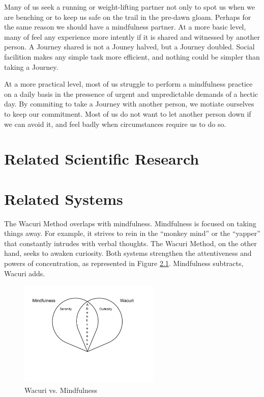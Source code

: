 \documentclass[12pt]{book}
\begin{document}
Many of us seek a running or weight-lifting partner not only to spot us when we are benching or
to keep us safe on the trail in the pre-dawn gloam.
Perhaps for the same reason we should have a mindfulness partner.
At a more basic level, many of feel any experience more intently if it is shared and
witnessed by another person. A Journey shared is not a Jouney halved, but a Journey doubled.
Social facilition makes any simple task more efficient, and nothing could be simpler
than taking a Journey.

At a more practical level, most of us struggle to perform a mindfulness practice
on a daily basis in the pressence of urgent and unpredictable demands of a hectic day.
By commiting to take a Journey with another person, we motiate ourselves to keep our
commitment. Most of us do not want to let another person down if we can avoid it,
and feel badly when circumstances require us to do so.

\chapter{Related Scientific Research}




\chapter{Related Systems}

The Wacuri Method overlaps with mindfulness.  Mindfulness is focused
on taking things away. For example, it strives to rein in the
``monkey mind'' or the ``yapper'' that constantly intrudes with
verbal thoughts. The Wacuri Method, on the other hand, seeks
to awaken curiosity. Both systems strengthen the attentiveness
and powers of concentration, as represented in Figure \ref{fig:wacurivsmindfulness}. Mindfulness subtracts, Wacuri adds.

\begin{figure}
  \centering
     \includegraphics[width=0.6\textwidth]{WacuriFigures/WacuriMindfulnessDiagram.png}
     \caption{Wacuri vs. Mindfulness}
  \label{fig:wacurivsmindfulness}     
\end{figure}
\end{document}
